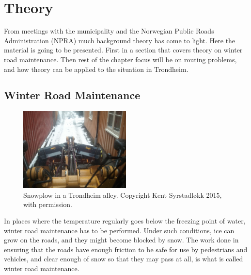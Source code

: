 \chapter{Theory}
\label{theory}

From meetings with the municipality and the Norwegian Public Roads Administration (NPRA) much background theory has come to light. Here the material is going to be presented. First in a section that covers theory on winter road maintenance. Then rest of the chapter focus will be on routing problems, and how theory can be applied to the situation in Trondheim.

\section{Winter Road Maintenance} %
\label{sec:snow_plowing}


\begin{figure}
    \begin{center}
        \includegraphics[width=0.5\textwidth]{figures/MachineryIllustrations/snowplow-Kent_Syrstadlokk-2012-04-18.jpg}
    \end{center}
    \caption{Snowplow in a Trondheim alley. Copyright Kent Syrstadløkk 2015, with permission.}
    \label{fig:snowplow_in_alley}
\end{figure}

In places where the temperature regularly goes below the freezing point of water, winter road maintenance has to be performed. Under such conditions, ice can grow on the roads, and they might become blocked by snow. The work done in ensuring that the roads have enough friction to be safe for use by pedestrians and vehicles, and clear enough of snow so that they may pass at all, is what is called winter road maintenance.


